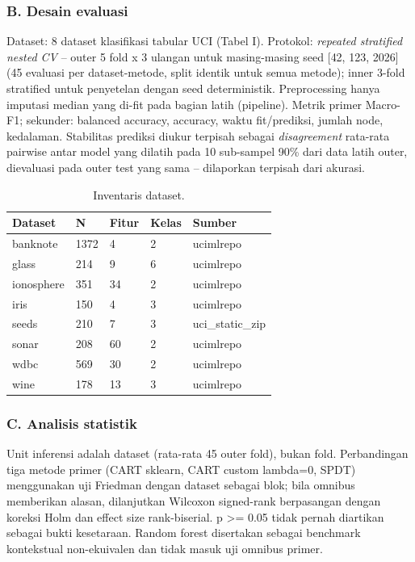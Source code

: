 \documentclass[
  conference]{IEEEtran}
\begin{document}
\subsubsection{B. Desain evaluasi}\label{b.-desain-evaluasi}

Dataset: 8 dataset klasifikasi tabular UCI (Tabel I). Protokol:
\emph{repeated stratified nested CV} -- outer 5 fold x 3 ulangan untuk
masing-masing seed {[}42, 123, 2026{]} (45 evaluasi per dataset-metode,
split identik untuk semua metode); inner 3-fold stratified untuk
penyetelan dengan seed deterministik. Preprocessing hanya imputasi
median yang di-fit pada bagian latih (pipeline). Metrik primer Macro-F1;
sekunder: balanced accuracy, accuracy, waktu fit/prediksi, jumlah node,
kedalaman. Stabilitas prediksi diukur terpisah sebagai
\emph{disagreement} rata-rata pairwise antar model yang dilatih pada 10
sub-sampel 90\% dari data latih outer, dievaluasi pada outer test yang
sama -- dilaporkan terpisah dari akurasi.

\begin{table}[!tb]
\centering
\caption{Inventaris dataset.}
\begin{tabular}{@{}lllll@{}}
\toprule\noalign{}
Dataset & N & Fitur & Kelas & Sumber \\
\midrule\noalign{}
\bottomrule\noalign{}
banknote & 1372 & 4 & 2 & ucimlrepo \\
glass & 214 & 9 & 6 & ucimlrepo \\
ionosphere & 351 & 34 & 2 & ucimlrepo \\
iris & 150 & 4 & 3 & ucimlrepo \\
seeds & 210 & 7 & 3 & uci\_static\_zip \\
sonar & 208 & 60 & 2 & ucimlrepo \\
wdbc & 569 & 30 & 2 & ucimlrepo \\
wine & 178 & 13 & 3 & ucimlrepo \\
\end{tabular}
\end{table}

\subsubsection{C. Analisis statistik}\label{c.-analisis-statistik}

Unit inferensi adalah dataset (rata-rata 45 outer fold), bukan fold.
Perbandingan tiga metode primer (CART sklearn, CART custom lambda=0,
SPDT) menggunakan uji Friedman dengan dataset sebagai blok; bila omnibus
memberikan alasan, dilanjutkan Wilcoxon signed-rank berpasangan dengan
koreksi Holm dan effect size rank-biserial. p \textgreater= 0.05 tidak
pernah diartikan sebagai bukti kesetaraan. Random forest disertakan
sebagai benchmark kontekstual non-ekuivalen dan tidak masuk uji omnibus
primer.
\end{document}
